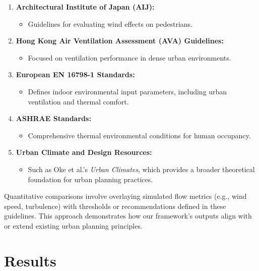 \documentclass[times,final]{elsarticle}
\begin{document}
\begin{enumerate}
\def\labelenumi{\arabic{enumi}.}
\item
  \textbf{Architectural Institute of Japan (AIJ):}

  \begin{itemize}
  \item
    Guidelines for evaluating wind effects on pedestrians.
  \end{itemize}
\item
  \textbf{Hong Kong Air Ventilation Assessment (AVA) Guidelines:}

  \begin{itemize}
  \item
    Focused on ventilation performance in dense urban environments.
  \end{itemize}
\item
  \textbf{European EN 16798-1 Standards:}

  \begin{itemize}
  \item
    Defines indoor environmental input parameters, including urban
    ventilation and thermal comfort.
  \end{itemize}
\item
  \textbf{ASHRAE Standards:}

  \begin{itemize}
  \item
    Comprehensive thermal environmental conditions for human occupancy.
  \end{itemize}
\item
  \textbf{Urban Climate and Design Resources:}

  \begin{itemize}
  \item
    Such as Oke et al.'s \emph{Urban Climates}, which provides a broader
    theoretical foundation for urban planning practices.
  \end{itemize}
\end{enumerate}

Quantitative comparisons involve overlaying simulated flow metrics
(e.g., wind speed, turbulence) with thresholds or recommendations
defined in these guidelines. This approach demonstrates how our
framework's outputs align with or extend existing urban planning
principles.


\section{Results}
\end{document}
